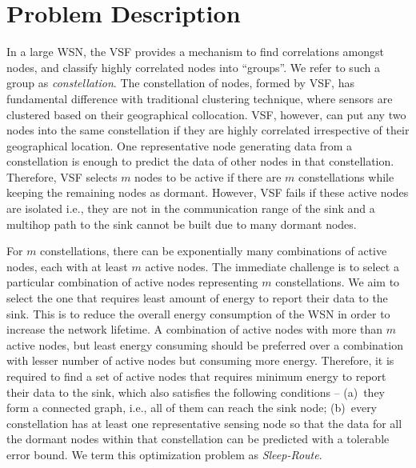 \documentclass[conference]{IEEEtran}
\begin{document}
\section{Problem Description}
\label{sec:problem}
In a large WSN, the VSF provides a mechanism to find correlations amongst nodes, and classify highly correlated nodes into ``groups''. We refer to such a group as \emph{constellation}. The constellation of nodes, formed by VSF, has fundamental difference with traditional clustering technique, where sensors are clustered based on their geographical collocation. VSF, however, can put any two nodes into the same constellation if they are highly correlated irrespective of their geographical location. One representative node generating data from a constellation is enough to predict the data of other nodes in that constellation. Therefore, VSF selects $m$ nodes to be active if there are $m$ constellations while keeping the remaining nodes as dormant. However, VSF fails if these active nodes are isolated i.e., they are not in the communication range of the sink and a multihop path to the sink cannot be built due to many dormant nodes. 

For $m$ constellations, there can be exponentially many combinations of active nodes, each with at least $m$ active nodes. The immediate challenge is to select a particular combination of active nodes representing $m$ constellations. We aim to select the one that requires least amount of energy to report their data to the sink. This is to reduce the overall energy consumption of the WSN in order to increase the network lifetime.  A combination of active nodes with more than $m$ active nodes, but least energy consuming should be preferred over a combination with lesser number of active nodes but consuming more energy. Therefore, it is required to find a set of active nodes that requires minimum energy to report their data to the sink, which also satisfies the following conditions -- (a)~they form a connected graph, i.e., all of them can reach the sink node; (b)~every constellation has at least one representative sensing node so that the data for all the dormant nodes within that constellation can be predicted with a tolerable error bound. We term this optimization problem as \emph{Sleep-Route}.
\end{document}
